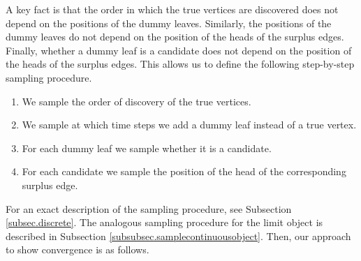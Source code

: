 A key fact is that the order in which the true vertices are discovered does not depend on the positions of the dummy leaves. Similarly, the positions of the dummy leaves do not depend on the position of the heads of the surplus edges. Finally, whether a dummy leaf is a candidate does not depend on the position of the heads of the surplus edges. This allows us to define the following step-by-step sampling procedure. 
\begin{enumerate}
    \item We sample the order of discovery of the true vertices.
    \item We sample at which time steps we add a dummy leaf instead of a true vertex. 
    \item For each dummy leaf we sample whether it is a candidate.
    \item For each candidate we sample the position of the head of the corresponding surplus edge.
\end{enumerate}
For an exact description of the sampling procedure, see Subsection \ref{subsec.discrete}. The analogous sampling procedure for the limit object is described in Subsection \ref{subsubsec.samplecontinuousobject}. Then, our approach to show convergence is as follows.


